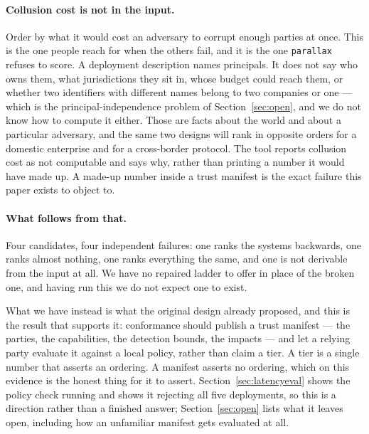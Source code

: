 \documentclass[11pt]{article}
\newcommand{\parallax}{\texttt{parallax}}
\begin{document}
\paragraph{Collusion cost is not in the input.} Order by what it would cost
an adversary to corrupt enough parties at once. This is the one people reach
for when the others fail, and it is the one \parallax{} refuses to score. A
deployment description names principals. It does not say who owns them, what
jurisdictions they sit in, whose budget could reach them, or whether two
identifiers with different names belong to two companies or one --- which is
the principal-independence problem of Section~\ref{sec:open}, and we do not
know how to compute it either. Those are facts about the world and about a
particular adversary, and the same two designs will rank in opposite orders
for a domestic enterprise and for a cross-border protocol. The tool reports
collusion cost as not computable and says why, rather than printing a number
it would have made up. A made-up number inside a trust manifest is the exact
failure this paper exists to object to.

\paragraph{What follows from that.} Four candidates, four independent
failures: one ranks the systems backwards, one ranks almost nothing, one
ranks everything the same, and one is not derivable from the input at all.
We have no repaired ladder to offer in place of the broken one, and having
run this we do not expect one to exist.

What we have instead is what the original design already proposed, and this
is the result that supports it: conformance should publish a trust manifest
--- the parties, the capabilities, the detection bounds, the impacts --- and
let a relying party evaluate it against a local policy, rather than claim a
tier. A tier is a single number that asserts an ordering.
A manifest asserts no ordering, which on this evidence is the honest thing
for it to assert. Section~\ref{sec:latencyeval} shows the policy check
running and shows it rejecting all five deployments, so this is a direction
rather than a finished answer; Section~\ref{sec:open} lists what it leaves
open, including how an unfamiliar manifest gets evaluated at all.
\end{document}

